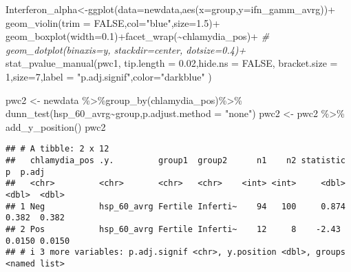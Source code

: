 \documentclass[
]{article}
\newenvironment{Shaded}{\begin{snugshade}}{\end{snugshade}}
\newcommand{\AttributeTok}[1]{\textcolor[rgb]{0.77,0.63,0.00}{#1}}
\newcommand{\CommentTok}[1]{\textcolor[rgb]{0.56,0.35,0.01}{\textit{#1}}}
\newcommand{\ConstantTok}[1]{\textcolor[rgb]{0.00,0.00,0.00}{#1}}
\newcommand{\DecValTok}[1]{\textcolor[rgb]{0.00,0.00,0.81}{#1}}
\newcommand{\FloatTok}[1]{\textcolor[rgb]{0.00,0.00,0.81}{#1}}
\newcommand{\FunctionTok}[1]{\textcolor[rgb]{0.00,0.00,0.00}{#1}}
\newcommand{\NormalTok}[1]{#1}
\newcommand{\OtherTok}[1]{\textcolor[rgb]{0.56,0.35,0.01}{#1}}
\newcommand{\SpecialCharTok}[1]{\textcolor[rgb]{0.00,0.00,0.00}{#1}}
\newcommand{\StringTok}[1]{\textcolor[rgb]{0.31,0.60,0.02}{#1}}
\begin{document}
\begin{Shaded}
\begin{Highlighting}[]
\NormalTok{Interferon\_alpha}\OtherTok{\textless{}{-}}\FunctionTok{ggplot}\NormalTok{(}\AttributeTok{data=}\NormalTok{newdata,}\FunctionTok{aes}\NormalTok{(}\AttributeTok{x=}\NormalTok{group,}\AttributeTok{y=}\NormalTok{ifn\_gamm\_avrg))}\SpecialCharTok{+}
  \FunctionTok{geom\_violin}\NormalTok{(}\AttributeTok{trim =} \ConstantTok{FALSE}\NormalTok{,}\AttributeTok{col=}\StringTok{"blue"}\NormalTok{,}\AttributeTok{size=}\FloatTok{1.5}\NormalTok{)}\SpecialCharTok{+}
  \FunctionTok{geom\_boxplot}\NormalTok{(}\AttributeTok{width=}\FloatTok{0.1}\NormalTok{)}\SpecialCharTok{+}\FunctionTok{facet\_wrap}\NormalTok{(}\SpecialCharTok{\textasciitilde{}}\NormalTok{chlamydia\_pos)}\SpecialCharTok{+}
  \CommentTok{\# geom\_dotplot(binaxis=\textquotesingle{}y\textquotesingle{}, stackdir=\textquotesingle{}center\textquotesingle{}, dotsize=0.4)+}
  \FunctionTok{stat\_pvalue\_manual}\NormalTok{(pwc1, }\AttributeTok{tip.length =} \FloatTok{0.02}\NormalTok{,}\AttributeTok{hide.ns =} \ConstantTok{FALSE}\NormalTok{,}
                     \AttributeTok{bracket.size =} \DecValTok{1}\NormalTok{,}\AttributeTok{size=}\DecValTok{7}\NormalTok{,}\AttributeTok{label =} \StringTok{"p.adj.signif"}\NormalTok{,}\AttributeTok{color=}\StringTok{"darkblue"}\NormalTok{ )}

\NormalTok{pwc2 }\OtherTok{\textless{}{-}}\NormalTok{ newdata }\SpecialCharTok{\%\textgreater{}\%}\FunctionTok{group\_by}\NormalTok{(chlamydia\_pos)}\SpecialCharTok{\%\textgreater{}\%}
  \FunctionTok{dunn\_test}\NormalTok{(hsp\_60\_avrg}\SpecialCharTok{\textasciitilde{}}\NormalTok{group,}\AttributeTok{p.adjust.method =} \StringTok{"none"}\NormalTok{)}
\NormalTok{pwc2 }\OtherTok{\textless{}{-}}\NormalTok{ pwc2 }\SpecialCharTok{\%\textgreater{}\%} \FunctionTok{add\_y\_position}\NormalTok{()}
\NormalTok{pwc2}
\end{Highlighting}
\end{Shaded}

\begin{verbatim}
## # A tibble: 2 x 12
##   chlamydia_pos .y.         group1  group2      n1    n2 statistic      p  p.adj
##   <chr>         <chr>       <chr>   <chr>    <int> <int>     <dbl>  <dbl>  <dbl>
## 1 Neg           hsp_60_avrg Fertile Inferti~    94   100     0.874 0.382  0.382 
## 2 Pos           hsp_60_avrg Fertile Inferti~    12     8    -2.43  0.0150 0.0150
## # i 3 more variables: p.adj.signif <chr>, y.position <dbl>, groups <named list>
\end{verbatim}
\end{document}
